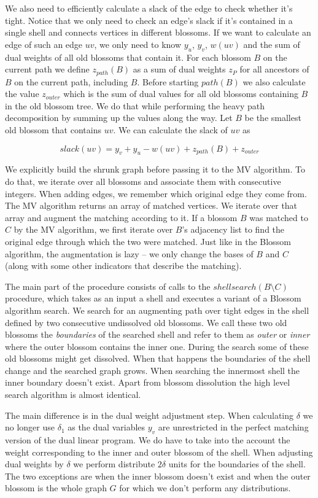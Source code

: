 We also need to efficiently calculate a slack of the edge to check whether it's tight. Notice that we only need to check an edge's slack if it's contained in a single shell and connects vertices in different blossoms. If we want to calculate an edge of such an edge $uv$, we only need to know $y_u$, $y_v$, $w(uv)$ and the sum of dual weights of all old blossoms that contain it. For each blossom $B$ on the current path we define $z_{path}(B)$ as a sum of dual weights $z_P$ for all ancestors of $B$ on the current path, including $B$. Before starting $path(B)$ we also calculate the value $z_{outer}$ which is the sum of dual values for all old blossoms containing $B$ in the old blossom tree. We do that while performing the heavy path decomposition by summing up the values along the way. Let $B$ be the smallest old blossom that contains $uv$. We can calculate the slack of $uv$ as

\[ slack(uv) = y_v + y_u - w(uv) + z_{path}(B) + z_{outer} \]

We explicitly build the shrunk graph before passing it to the MV algorithm. To do that, we iterate over all blossoms and associate them with consecutive integers. When adding edges, we remember which original edge they come from. The MV algorithm returns an array of matched vertices. We iterate over that array and augment the matching according to it. If a blossom $B$ was matched to $C$ by the MV algorithm, we first iterate over $B$'s adjacency list to find the original edge through which the two were matched. Just like in the Blossom algorithm, the augmentation is lazy – we only change the bases of $B$ and $C$ (along with some other indicators that describe the matching).

The main part of the procedure consists of calls to the $shellsearch(B \setminus C)$ procedure, which takes as an input a shell and executes a variant of a Blossom algorithm search. We search for an augmenting path over tight edges in the shell defined by two consecutive undissolved old blossoms. We call these two old blossoms the \textit{boundaries} of the searched shell and refer to them as \textit{outer} or \textit{inner} where the outer blossom contains the inner one. During the search some of these old blossoms might get dissolved. When that happens the boundaries of the shell change and the searched graph grows. When searching the innermost shell the inner boundary doesn't exist. Apart from blossom dissolution the high level search algorithm is almost identical.

The main difference is in the dual weight adjustment step. When calculating $\delta$ we no longer use $\delta_1$ as the dual variables $y_v$ are unrestricted in the perfect matching version of the dual linear program. We do have to take into the account the weight corresponding to the inner and outer blossom of the shell. When adjusting dual weights by $\delta$ we perform distribute $2\delta$ units for the boundaries of the shell. The two exceptions are when the inner blossom doesn't exist and when the outer blossom is the whole graph $G$ for which we don't perform any distributions.

